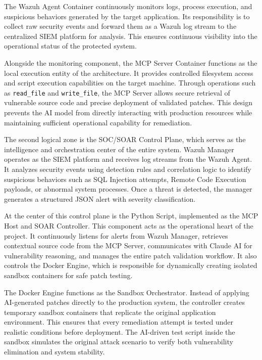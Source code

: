\documentclass[12pt]{report}
\begin{document}
The Wazuh Agent Container continuously monitors logs, process execution, and suspicious behaviors generated by the target application. Its responsibility is to collect raw security events and forward them as a Wazuh log stream to the centralized SIEM platform for analysis. This ensures continuous visibility into the operational status of the protected system.

Alongside the monitoring component, the MCP Server Container functions as the local execution entity of the architecture. It provides controlled filesystem access and script execution capabilities on the target machine. Through operations such as \texttt{read\_file} and \texttt{write\_file}, the MCP Server allows secure retrieval of vulnerable source code and precise deployment of validated patches. This design prevents the AI model from directly interacting with production resources while maintaining sufficient operational capability for remediation.

The second logical zone is the SOC/SOAR Control Plane, which serves as the intelligence and orchestration center of the entire system. Wazuh Manager operates as the SIEM platform and receives log streams from the Wazuh Agent. It analyzes security events using detection rules and correlation logic to identify suspicious behaviors such as SQL Injection attempts, Remote Code Execution payloads, or abnormal system processes. Once a threat is detected, the manager generates a structured JSON alert with severity classification.

At the center of this control plane is the Python Script, implemented as the MCP Host and SOAR Controller. This component acts as the operational heart of the project. It continuously listens for alerts from Wazuh Manager, retrieves contextual source code from the MCP Server, communicates with Claude AI for vulnerability reasoning, and manages the entire patch validation workflow. It also controls the Docker Engine, which is responsible for dynamically creating isolated sandbox containers for safe patch testing.

The Docker Engine functions as the Sandbox Orchestrator. Instead of applying AI-generated patches directly to the production system, the controller creates temporary sandbox containers that replicate the original application environment. This ensures that every remediation attempt is tested under realistic conditions before deployment. The AI-driven test script inside the sandbox simulates the original attack scenario to verify both vulnerability elimination and system stability.
\end{document}
